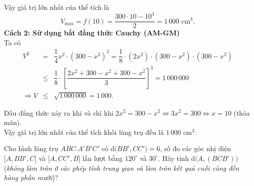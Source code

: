 \begin{ex}
{\begin{center}
\begin{tikzpicture}
			\end{tikzpicture}
		\end{center}
		Vậy giá trị lớn nhất của thể tích là
		\[V_{\max} = f(10) = \dfrac{300 \cdot 10 - 10^3}{2} = 1\,000\text{ cm}^3.\]
		\textbf{Cách 2: Sử dụng bất đẳng thức Cauchy (AM-GM)}\\
		Ta có
		\allowdisplaybreaks
		\begin{eqnarray*}
			V^2 &=& \dfrac{1}{4}x^2\cdot\left(300 - x^2\right)^2 = \dfrac{1}{8} \cdot \left(2x^2\right) \cdot \left(300 - x^2\right) \cdot \left(300 - x^2\right) \\
			&\le& \dfrac{1}{8} \cdot \left[\dfrac{2x^2 + 300 - x^2 + 300 - x^2}{3}\right]^3= 1\,000\,000 \\
			\Rightarrow V &\le& \sqrt{1\,000\,000} = 1\,000.
		\end{eqnarray*}
		\par Dấu đẳng thức xảy ra khi và chỉ khi $2x^2 = 300 - x^2 \Leftrightarrow 3x^2 = 300 \Leftrightarrow x = 10$ (thỏa mãn).\\
		Vậy giá trị lớn nhất của thể tích khối lăng trụ đều là $1\,000\text{ cm}^3$.
	}
\end{ex}
\begin{ex}%
	Cho hình lăng trụ $ABC.A'B'C'$ có $\mathrm{d}\big(BB',CC'\big)=6$, số đo các góc nhị diện $\big[A,BB',C\big]$ và $\big[A,CC',B\big]$ lần lượt bằng $120^{\circ}$ và $30^{\circ}$. Hãy tính $\mathrm{d}\big(A,(BCB')\big)$ (\textit{không làm tròn ở các phép tính trung gian và làm tròn kết quả cuối cùng đến hàng phần mười})?
	\par
	\loigiai{
		
	}
\end{ex}


